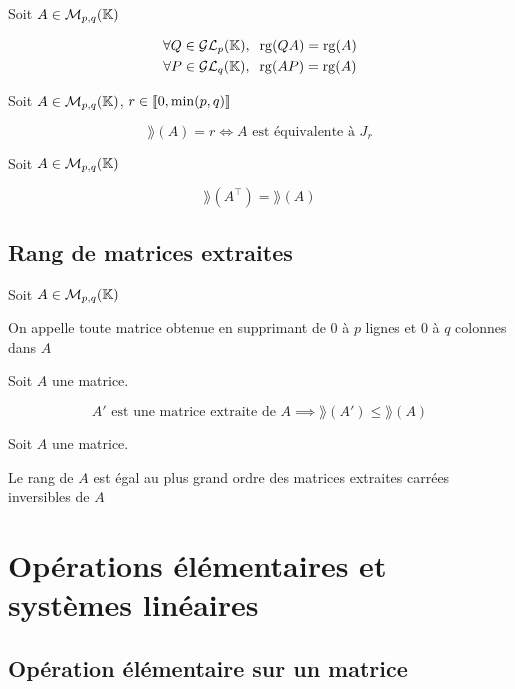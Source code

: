 \begin{prp}
Soit $A \in \operatorname{\mathcal{M}}_{p, q}(\mathbb{K})$

\begin{gather*}
    \forall Q \in \mathcal{GL}_p(\mathbb{K}), \;\; \operatorname{rg}(QA) = \operatorname{rg}(A) \\
    \forall P \in \mathcal{GL}_q(\mathbb{K}), \;\; \operatorname{rg}(AP) = \operatorname{rg}(A)
\end{gather*}
\end{prp}

\begin{prp}
Soit $A \in \operatorname{\mathcal{M}}_{p, q}(\mathbb{K})$, $r \in \llbracket 0, \min(p, q) \rrbracket$

\[
    \rang(A) = r \iff A \text{ est équivalente à } J_r
\]
\end{prp}

\begin{prp}
Soit $A \in \operatorname{\mathcal{M}}_{p, q}(\mathbb{K})$

\[
    \rang(A^\intercal) = \rang(A)
\]
\end{prp}


\subsection{Rang de matrices extraites}

\begin{dfn}
Soit $A \in \operatorname{\mathcal{M}}_{p, q}(\mathbb{K})$

On appelle  toute matrice obtenue en
supprimant de $0$ à $p$ lignes et $0$ à $q$ colonnes dans $A$
\end{dfn}

\begin{prp}
Soit $A$ une matrice.

\[
    A' \text{ est une matrice extraite de } A \implies \rang(A') \leq
    \rang(A)
\]
\end{prp}

\begin{prp}
Soit $A$ une matrice.

Le rang de $A$ est égal au plus grand ordre des matrices
extraites carrées inversibles de $A$
\end{prp}



\section{Opérations élémentaires et systèmes linéaires}


\subsection{Opération élémentaire sur un matrice}


